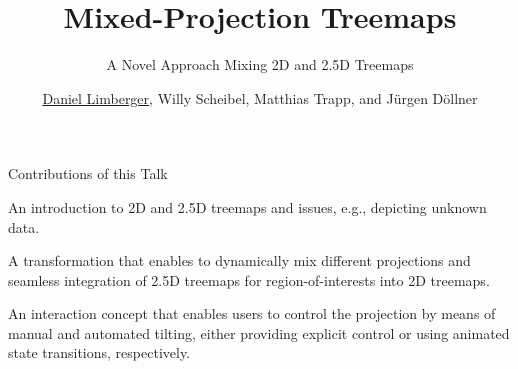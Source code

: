\documentclass[aspectratio=169,10pt,english]{beamer}
\title{Mixed-Projection Treemaps}
\subtitle{A Novel Approach Mixing 2D and 2.5D Treemaps}
\author{\underline{Daniel Limberger}, Willy Scheibel, Matthias Trapp, and Jürgen Döllner}
\institute{Hasso Plattner Institute, University of Potsdam, Germany}
\begin{document}
\setlength{\leftmargini}{10pt}

\begin{frame}[plain]
	\titlepage
\end{frame}

\begin{frame}[t]{Contributions of this Talk}

    \bigskip

    \Large{}\medskip\normalsize

    An introduction to 2D and 2.5D treemaps and issues, e.g., depicting unknown data.

    \bigskip

    \Large{}\medskip\normalsize

    A transformation that enables to dynamically mix different projections and seamless integration of 2.5D treemaps for region-of-interests into 2D treemaps.

    \bigskip

    \Large{}\medskip\normalsize

    An interaction concept that enables users to control the projection by means of manual and automated tilting, either providing explicit control or using animated state transitions, respectively.

\end{frame}
\end{document}
